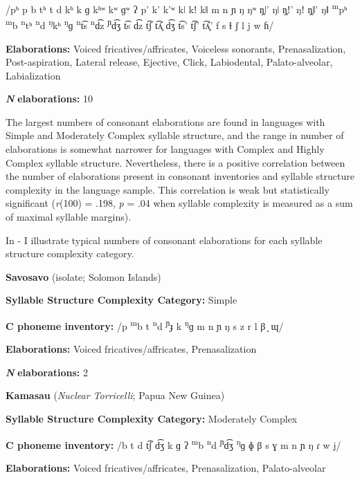 /pʰ p b tʰ t d kʰ k ɡ kʰʷ kʷ ɡʷ ʔ p’ k’ k’ʷ kǀ kǃ kǁ m n ɲ ŋ ŋʷ ŋ̥ǀ’ ŋǀ ŋ̥ǃ’ ŋǃ ŋ̥ǁ’ ŋǁ \textsuperscript{m}pʰ \textsuperscript{m}b \textsuperscript{n}tʰ \textsuperscript{n}d \textsuperscript{ŋ}kʰ \textsuperscript{ŋ}ɡ \textsuperscript{n}t͡s \textsuperscript{n}d͡z \textsuperscript{ɲ}d͡ʒ t͡s d͡z t͡ʃ t͡ʎ̥ d͡ʒ t͡s’ t͡ʃ’ t͡ʎ̥’ f s ɬ ʃ l j w ɦ/

\textbf{Elaborations:} Voiced fricatives/affricates, Voiceless sonorants, Prenasalization, Post-aspiration, Lateral release, Ejective, Click, Labiodental, Palato-alveolar, Labialization

\textbf{\textit{N}} \textbf{elaborations:} 10
\z

  The largest numbers of consonant elaborations are found in languages with Simple and Moderately Complex syllable structure, and the range in number of elaborations is somewhat narrower for languages with Complex and Highly Complex syllable structure. Nevertheless, there is a positive correlation between the number of elaborations present in consonant inventories and syllable structure complexity in the language sample. This correlation is weak but statistically significant (\textit{r}(100) = .198, \textit{p} = .04 when syllable complexity is measured as a sum of maximal syllable margins).

  In - I illustrate typical numbers of consonant elaborations for each syllable structure complexity category.

\ea\label{ex:4.28}
  \textbf{Savosavo} (isolate; Solomon Islands)

\textbf{Syllable Structure Complexity Category:} Simple

\textbf{C phoneme inventory:} /p \textsuperscript{m}b t \textsuperscript{n}d \textsuperscript{ɲ}ɟ k \textsuperscript{ŋ}ɡ m n ɲ ŋ s z r l β ̞ ɰ/

\textbf{Elaborations:} Voiced fricatives/affricates, Prenasalization

\textbf{\textit{N}} \textbf{elaborations:} 2
\z

\ea\label{ex:4.29}
  \textbf{Kamasau} (\textit{Nuclear Torricelli}; Papua New Guinea)

\textbf{Syllable Structure Complexity Category:} Moderately Complex

\textbf{C phoneme inventory:} /b t d t͡ʃ d͡ʒ k ɡ ʔ \textsuperscript{m}b \textsuperscript{n}d \textsuperscript{ɲ}d͡ʒ \textsuperscript{ŋ}ɡ ɸ β s ɣ m n ɲ ŋ ɾ w j/

\textbf{Elaborations:} Voiced fricatives/affricates, Prenasalization, Palato-alveolar

